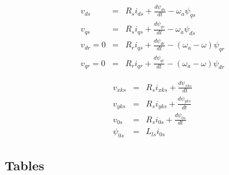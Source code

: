 \documentclass[a4paper,oneside,onecolumn,draftcls,12pt,conference]{IEEEtran}
\begin{document}
\begin{minipage}[b]{0.55\textwidth}
	 \begin{eqnarray}
         {v_{ds}} &=& {R_s}{i_{ds}} + \frac{{d{\psi _{ds}}}}{{dt}} - {\omega _a}{\psi _{qs}}\\
         {v_{qs}} &=& {R_s}{i_{qs}} + \frac{{d{\psi _{qs}}}}{{dt}} - {\omega _a}{\psi _{ds}}\\
         {v_{dr}} = 0 &=& {R_r}{i_{qs}} + \frac{{d{\psi _{dr}}}}{{dt}} - \left( {{\omega _a} - \omega } \right){\psi _{qr}}\\
         {v_{qr}} = 0 &= &{R_r}{i_{qr}} + \frac{{d{\psi _{qr}}}}{{dt}} - \left( {{\omega _a} - \omega } \right){\psi _{dr}}
 \end{eqnarray}
\end{minipage}
\quad
\begin{minipage}[b]{0.35\textwidth} 
	 \begin{eqnarray}
	{v_{xks}} &=& {R_s}{i_{xks}} + \frac{{d{\psi _{xks}}}}{{dt}}\\
	{v_{yks}} &=& {R_s}{i_{yks}} + \frac{{d{\psi _{yks}}}}{{dt}}\\	
	{v_{0s}} &=& {R_s}{i_{0s}} + \frac{{d{\psi _{0s}}}}{{dt}}\\
	{\psi _{0s}} &=& {L_{ls}}{i_{0s}}
	\end{eqnarray}
\end{minipage}    		

  	
  	
 
 
 
 
 
 
 
 

  \subsection{Tables}
 
\end{document}
